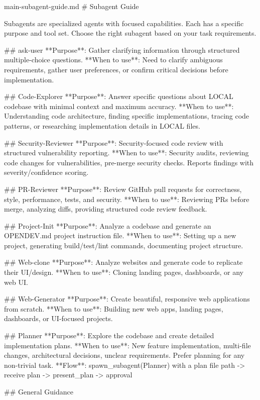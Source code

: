 \begin{prompttemplate}{main-subagent-guide.md}
# Subagent Guide

Subagents are specialized agents with focused capabilities. Each has a
specific purpose and tool set. Choose the right subagent based on your
task requirements.

## ask-user
**Purpose**: Gather clarifying information through structured
multiple-choice questions.
**When to use**: Need to clarify ambiguous requirements, gather user
preferences, or confirm critical decisions before implementation.

## Code-Explorer
**Purpose**: Answer specific questions about LOCAL codebase with minimal
context and maximum accuracy.
**When to use**: Understanding code architecture, finding specific
implementations, tracing code patterns, or researching implementation
details in LOCAL files.

## Security-Reviewer
**Purpose**: Security-focused code review with structured vulnerability
reporting.
**When to use**: Security audits, reviewing code changes for
vulnerabilities, pre-merge security checks. Reports findings with
severity/confidence scoring.

## PR-Reviewer
**Purpose**: Review GitHub pull requests for correctness, style,
performance, tests, and security.
**When to use**: Reviewing PRs before merge, analyzing diffs, providing
structured code review feedback.

## Project-Init
**Purpose**: Analyze a codebase and generate an OPENDEV.md project
instruction file.
**When to use**: Setting up a new project, generating build/test/lint
commands, documenting project structure.

## Web-clone
**Purpose**: Analyze websites and generate code to replicate their
UI/design.
**When to use**: Cloning landing pages, dashboards, or any web UI.

## Web-Generator
**Purpose**: Create beautiful, responsive web applications from scratch.
**When to use**: Building new web apps, landing pages, dashboards, or
UI-focused projects.

## Planner
**Purpose**: Explore the codebase and create detailed implementation plans.
**When to use**: New feature implementation, multi-file changes,
architectural decisions, unclear requirements. Prefer planning for any
non-trivial task.
**Flow**: spawn_subagent(Planner) with a plan file path -> receive plan
-> present_plan -> approval

## General Guidance


\end{prompttemplate}
